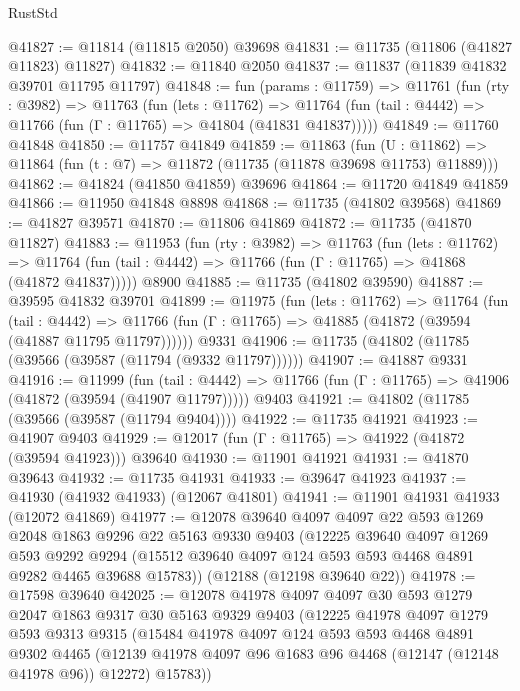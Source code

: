 \begin{lexlean}{RustStd}
\begin{coremodule}
@41827 := @11814 (@11815 @2050) @39698
@41831 := @11735 (@11806 (@41827 @11823) @11827)
@41832 := @11840 @2050
@41837 := @11837 (@11839 @41832 @39701 @11795 @11797)
@41848 := fun (params : @11759) =>
  @11761
    (fun (rty : @3982) =>
    @11763
      (fun (lets : @11762) =>
      @11764 (fun (tail : @4442) => @11766 (fun (Γ : @11765) => @41804 (@41831 @41837)))))
@41849 := @11760 @41848
@41850 := @11757 @41849
@41859 := @11863
    (fun (U : @11862) => @11864 (fun (t : @7) => @11872 (@11735 (@11878 @39698 @11753) @11889)))
@41862 := @41824 (@41850 @41859) @39696
@41864 := @11720 @41849 @41859
@41866 := @11950 @41848 @8898
@41868 := @11735 (@41802 @39568)
@41869 := @41827 @39571
@41870 := @11806 @41869
@41872 := @11735 (@41870 @11827)
@41883 := @11953
    (fun (rty : @3982) =>
    @11763
      (fun (lets : @11762) =>
      @11764 (fun (tail : @4442) => @11766 (fun (Γ : @11765) => @41868 (@41872 @41837)))))
    @8900
@41885 := @11735 (@41802 @39590)
@41887 := @39595 @41832 @39701
@41899 := @11975
    (fun (lets : @11762) =>
    @11764
      (fun (tail : @4442) =>
      @11766 (fun (Γ : @11765) => @41885 (@41872 (@39594 (@41887 @11795 @11797))))))
    @9331
@41906 := @11735 (@41802 (@11785 (@39566 (@39587 (@11794 (@9332 @11797))))))
@41907 := @41887 @9331
@41916 := @11999
    (fun (tail : @4442) => @11766 (fun (Γ : @11765) => @41906 (@41872 (@39594 (@41907 @11797)))))
    @9403
@41921 := @41802 (@11785 (@39566 (@39587 (@11794 @9404))))
@41922 := @11735 @41921
@41923 := @41907 @9403
@41929 := @12017 (fun (Γ : @11765) => @41922 (@41872 (@39594 @41923))) @39640
@41930 := @11901 @41921
@41931 := @41870 @39643
@41932 := @11735 @41931
@41933 := @39647 @41923
@41937 := @41930 (@41932 @41933) (@12067 @41801)
@41941 := @11901 @41931 @41933 (@12072 @41869)
@41977 := @12078
    @39640
    @4097
    @4097
    @22
    @593
    @1269
    @2048
    @1863
    @9296
    @22
    @5163
    @9330
    @9403
    (@12225
      @39640
      @4097
      @1269
      @593
      @9292
      @9294
      (@15512 @39640 @4097 @124 @593 @593 @4468 @4891 @9282 @4465 @39688 @15783))
    (@12188 (@12198 @39640 @22))
@41978 := @17598 @39640
@42025 := @12078
    @41978
    @4097
    @4097
    @30
    @593
    @1279
    @2047
    @1863
    @9317
    @30
    @5163
    @9329
    @9403
    (@12225
      @41978
      @4097
      @1279
      @593
      @9313
      @9315
      (@15484
        @41978
        @4097
        @124
        @593
        @593
        @4468
        @4891
        @9302
        @4465
        (@12139 @41978 @4097 @96 @1683 @96 @4468 (@12147 (@12148 @41978 @96)) @12272)
        @15783))

\end{coremodule}
\end{lexlean}
